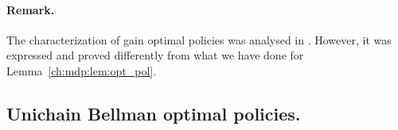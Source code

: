 \paragraph{Remark.} The characterization of gain optimal policies was analysed in \cite{puterman2014markov, schweitzer1978functional}.
However, it was expressed and proved differently from what we have done for Lemma~\ref{ch:mdp:lem:opt_pol}.

%
%
%

\subsection{Unichain Bellman optimal policies.}

